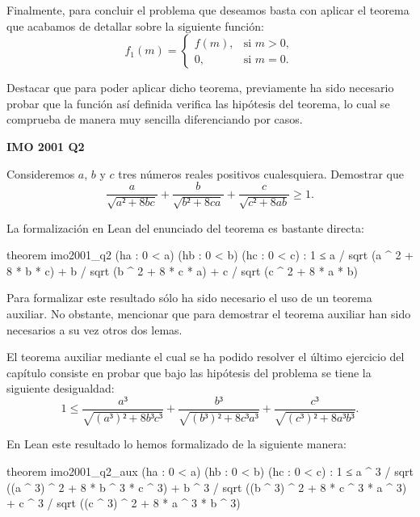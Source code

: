 Finalmente, para concluir el problema que deseamos basta con aplicar el teorema
que acabamos de detallar sobre la siguiente función:
 \begin{equation}
    f_1(m)=\left\lbrace\begin{array}{ll}
                         f(m), & \text{si } m>0, \\
                         0, & \text{si } m=0.
                       \end{array}\right.
\end{equation}

Destacar que para poder aplicar dicho teorema, previamente ha sido necesario
probar que la función así definida verifica las hipótesis del teorema, lo cual
se comprueba de manera muy sencilla diferenciando por casos.
                   
\textbf{IMO 2001 Q2}

\noindent
Consideremos \(a\), \(b\) y \(c\) tres números reales positivos
cualesquiera. Demostrar que
\begin{equation}\label{introq2}
  \frac{a}{\sqrt{a²+8bc}} +
  \frac{b}{\sqrt{b²+8ca}} +
  \frac{c}{\sqrt{c²+8ab}} ≥ 1.
\end{equation}

La formalización en Lean del enunciado del teorema es bastante directa:

\begin{leancode}
theorem imo2001_q2
  (ha : 0 < a)
  (hb : 0 < b)
  (hc : 0 < c)
  : 1 ≤ a / sqrt (a ^ 2 + 8 * b * c) +
        b / sqrt (b ^ 2 + 8 * c * a) +
        c / sqrt (c ^ 2 + 8 * a * b)
\end{leancode}

Para formalizar este resultado sólo ha sido necesario el uso de un teorema
auxiliar. No obstante, mencionar que para demostrar el teorema auxiliar han
sido necesarios a su vez otros dos lemas.

El teorema auxiliar mediante el cual se ha podido resolver el último ejercicio
del capítulo consiste en probar que bajo las hipótesis del problema se tiene
la siguiente desigualdad:
\begin{equation}\label{introteoraux}
   1 ≤ \frac{a³}{\sqrt{(a³)²+8b³c³}}+\frac{b³}{\sqrt{(b³)²+8c³a³}}+
    \frac{c³}{\sqrt{(c³)²+8a³b³}}.
\end{equation}
  
En Lean este resultado lo hemos formalizado de la siguiente manera:
\begin{leancode}
theorem imo2001_q2_aux
  (ha : 0 < a)
  (hb : 0 < b)
  (hc : 0 < c)
  : 1 ≤ a ^ 3 / sqrt ((a ^ 3) ^ 2 + 8 * b ^ 3 * c ^ 3) +
        b ^ 3 / sqrt ((b ^ 3) ^ 2 + 8 * c ^ 3 * a ^ 3) +
        c ^ 3 / sqrt ((c ^ 3) ^ 2 + 8 * a ^ 3 * b ^ 3)
\end{leancode}

